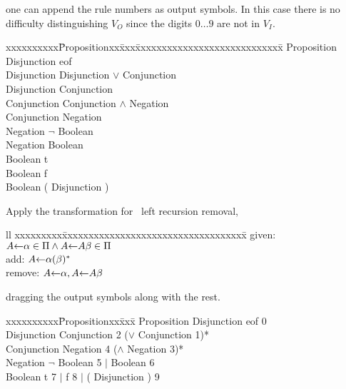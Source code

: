 \noindent
one can append the rule numbers as output symbols.  
In this case there is no difficulty distinguishing $V_O$
since the digits $0\ldots 9$ are not in $V_I$.

\begin{samepage}
\begin{em}
\begin{tabbing}
xxxxxxxxxx\=Propositionxx\=xxx\=xxxxxxxxxxxxxxxxxxxxxxxxxxxx\=\kill
\>Proposition \>\la\> Disjunction {\rm eof}               \\        
\>Disjunction \>\la\> Disjunction $\vee$ Conjunction      \\
\>Disjunction \>\la\> Conjunction                         \\
\>Conjunction \>\la\> Conjunction $\wedge$ Negation       \\
\>Conjunction \>\la\> Negation                            \\
\>Negation    \>\la\> $\neg$ Boolean                      \\
\>Negation    \>\la\> Boolean                             \\
\>Boolean     \>\la\> {\rm t}                             \\
\>Boolean     \>\la\> {\rm f}                             \\
\>Boolean     \>\la\> {\rm(} Disjunction {\rm)}        
\end{tabbing}
\end{em}
\end{samepage}

\noindent
Apply the transformation for \cfg\ left recursion removal,
\begin{tabbing}{ll}
xxxxxxxxx\=xxxxxxxxxxxxxxxxxxxxxxxxxxxxxxxxxxx\=\kill
given:
  \> $A\mbox{$\leftarrow$}\alpha\in \Pi\wedge A\mbox{$\leftarrow$} A \beta\in\Pi$ \\
add:
  \> $A\mbox{$\leftarrow$}\alpha(\beta)^*$\\
remove:
  \> $A\mbox{$\leftarrow$}\alpha, A\mbox{$\leftarrow$} A\beta$
\end{tabbing}

dragging the output symbols along with the rest.

\begin{samepage}
\begin{em}
\begin{tabbing}
xxxxxxxxxx\=Propositionxx\=xxx\=\kill
\>Proposition \>\la\> Disjunction {\rm eof} {\rm 0}                      \\        
\>Disjunction \>\la\> Conjunction {\rm 2} ($\vee$ Conjunction {\rm 1})*  \\
\>Conjunction \>\la\> Negation {\rm 4} ($\wedge$ Negation {\rm 3})*      \\
\>Negation    \>\la\> $\neg$ Boolean {\rm 5} $|$ Boolean {\rm 6}         \\
\>Boolean     \>\la\> {\rm t} {\rm 7} $|$ {\rm f} {\rm 8} $|$ {\rm(} Disjunction {\rm)} {\rm 9} 
\end{tabbing}
\end{em}
\end{samepage}

